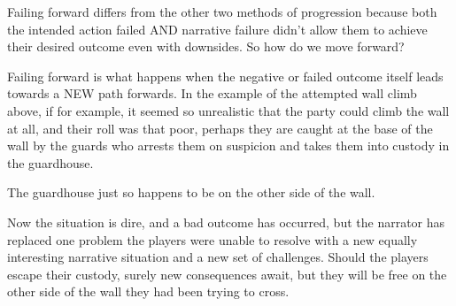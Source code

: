 Failing forward differs from the other two methods of progression because both the intended action failed AND narrative failure didn’t allow them to achieve their desired outcome even with downsides. So how do we move forward?

Failing forward is what happens when the negative or failed outcome itself leads towards a NEW path forwards. In the example of the attempted wall climb above, if for example, it seemed so unrealistic that the party could climb the wall at all, and their roll was that poor, perhaps they are caught at the base of the wall by the guards who arrests them on suspicion and takes them into custody in the guardhouse.

The guardhouse just so happens to be on the other side of the wall.

Now the situation is dire, and a bad outcome has occurred, but the narrator has replaced one problem the players were unable to resolve with a new equally interesting narrative situation and a new set of challenges. Should the players escape their custody, surely new consequences await, but they will be free on the other side of the wall they had been trying to cross.